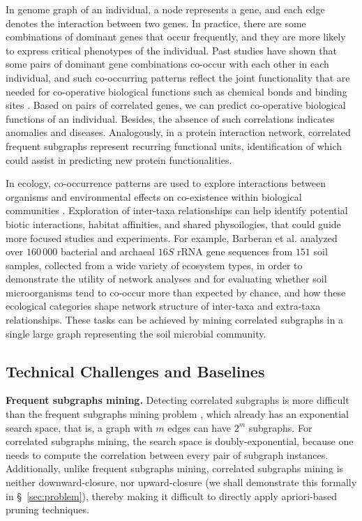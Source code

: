  In genome graph of an individual, a node represents a gene,
and each edge denotes the interaction between two genes. In practice, there are some combinations of dominant genes that
occur frequently, and they are more likely to express critical phenotypes of the individual.
Past studies have shown that some pairs of dominant gene combinations co-occur with each other in each individual,
and such co-occurring patterns reflect the joint functionality that are needed for co-operative biological functions such as chemical bonds
and binding sites \cite{LFSW14}. Based on pairs of correlated genes, we can predict co-operative biological functions of an
individual. Besides, the absence of such correlations indicates anomalies and diseases.
Analogously, in a protein interaction network, correlated frequent subgraphs represent recurring functional units,
identification of which could assist in predicting new protein functionalities.

In ecology, co-occurrence patterns are used to explore interactions between organisms
and environmental effects on co-existence within biological communities \cite{WHH14}.
Exploration of inter-taxa relationships can help identify potential biotic interactions, habitat affinities, and shared physoilogies,
that could guide more focused studies and experiments. For example, Barberan et al. \cite{BBCF12} analyzed
over $160\,000$ bacterial and archaeal $16S$ rRNA gene sequences from $151$ soil samples, collected
from a wide variety of ecosystem types, in order to demonstrate the utility of network
analyses and for evaluating whether soil microorganisms tend to co-occur more
than expected by chance, and how these
ecological categories shape network structure of inter-taxa and extra-taxa relationships.
These tasks can be achieved by mining correlated subgraphs in a single large graph
representing the soil microbial community.

\vspace{-0.05in}
\subsection{Technical Challenges and Baselines}
\label{sec:baseline}
%
\textbf{Frequent subgraphs mining. } Detecting correlated subgraphs is more difficult
than the frequent subgraphs mining problem \cite{WMFP05}, which already has an exponential search space, that is, a graph with $m$ edges
can have $2^m$ subgraphs. For correlated subgraphs mining, the search space is doubly-exponential, because
one needs to compute the correlation between every pair of subgraph instances.
 Additionally, unlike frequent subgraphs mining,
correlated subgraphs mining is neither downward-closure, nor upward-closure (we shall demonstrate this formally
in \S~\ref{sec:problem}), thereby making it difficult to directly apply apriori-based pruning techniques.

